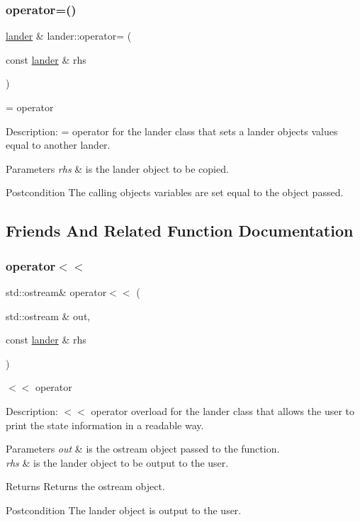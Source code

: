 \subsubsection{\texorpdfstring{operator=()}{operator=()}}
{\footnotesize\ttfamily \hyperlink{classlander}{lander} \& lander\+::operator= (\begin{DoxyParamCaption}\item[{const \hyperlink{classlander}{lander} \&}]{rhs }\end{DoxyParamCaption})}



= operator 

Description\+: = operator for the lander class that sets a lander object\textquotesingle{}s values equal to another lander. 
\begin{DoxyParams}{Parameters}
{\em rhs} & is the lander object to be copied. \\
\hline
\end{DoxyParams}
\begin{DoxyPostcond}{Postcondition}
The calling object\textquotesingle{}s variables are set equal to the object passed. 
\end{DoxyPostcond}


\subsection{Friends And Related Function Documentation}
\mbox{\label{classlander_ab6f8c74d299fffd0364da0d38b9a8509}} 
\subsubsection{\texorpdfstring{operator$<$$<$}{operator<<}}
{\footnotesize\ttfamily std\+::ostream\& operator$<$$<$ (\begin{DoxyParamCaption}\item[{std\+::ostream \&}]{out,  }\item[{const \hyperlink{classlander}{lander} \&}]{rhs }\end{DoxyParamCaption})\hspace{0.3cm}{\ttfamily [friend]}}



$<$$<$ operator 

Description\+: $<$$<$ operator overload for the lander class that allows the user to print the state information in a readable way. 
\begin{DoxyParams}{Parameters}
{\em out} & is the ostream object passed to the function. \\
\hline
{\em rhs} & is the lander object to be output to the user. \\
\hline
\end{DoxyParams}
\begin{DoxyReturn}{Returns}
Returns the ostream object. 
\end{DoxyReturn}
\begin{DoxyPostcond}{Postcondition}
The lander object is output to the user. 
\end{DoxyPostcond}


